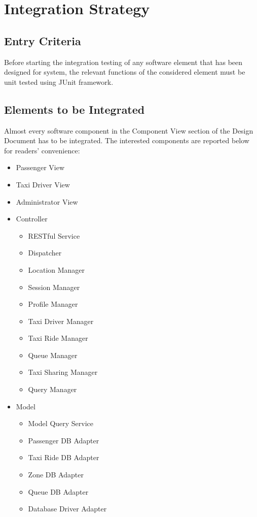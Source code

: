 \section{Integration Strategy}

\subsection{Entry Criteria}
Before starting the integration testing of any software element that has been designed for \myTaxiService{} system, the relevant functions of the considered element must be unit tested using JUnit framework.

\subsection{Elements to be Integrated}
Almost every software component in the Component View section of the Design Document has to be integrated.
The interested components are reported below for readers' convenience:
\begin{itemize}
	\item Passenger View
	\item Taxi Driver View
	\item Administrator View
	\item Controller
	\begin{itemize}
		\item RESTful Service
		\item Dispatcher
		\item Location Manager
		\item Session Manager
		\item Profile Manager
		\item Taxi Driver Manager
		\item Taxi Ride Manager
		\item Queue Manager
		\item Taxi Sharing Manager
		\item Query Manager
	\end{itemize}
	\item Model
	\begin{itemize}
		\item Model Query Service
		\item Passenger DB Adapter
		\item Taxi Ride DB Adapter
		\item Zone DB Adapter
		\item Queue DB Adapter
		\item Database Driver Adapter
	\end{itemize}
\end{itemize}

